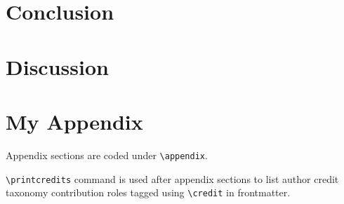 \documentclass[a4paper,fleqn]{cas-sc}
\begin{document}
\section{Conclusion}
\section{Discussion}
\appendix
\section{My Appendix}
Appendix sections are coded under \verb+\appendix+.

\verb+\printcredits+ command is used after appendix sections to list 
author credit taxonomy contribution roles tagged using \verb+\credit+ 
in frontmatter.

\printcredits

%


\end{document}
